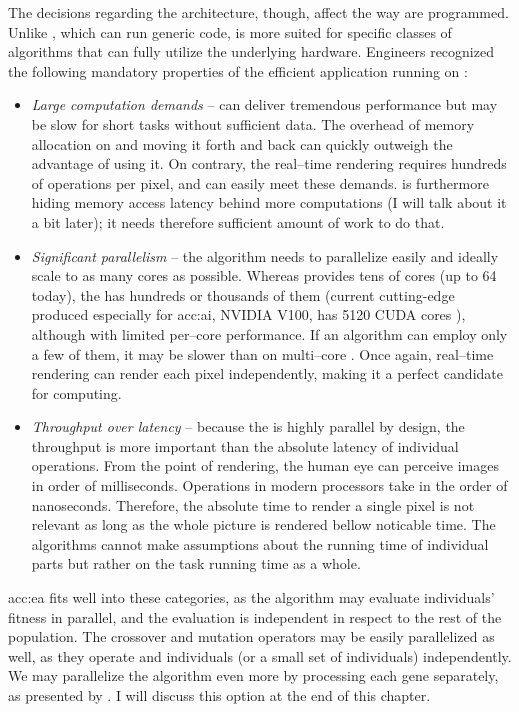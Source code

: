 The decisions regarding the architecture, though, affect the way  are programmed. Unlike \cpu, which can run generic code, \gpu is more suited for specific classes of algorithms that can fully utilize the underlying hardware. Engineers recognized the following mandatory properties of the efficient application running on \gpu \citep{GPUComputingOwens}:
\begin{itemize}
    \item \textit{Large computation demands} -- \gpu can deliver tremendous performance but may be slow for short tasks without sufficient data. The overhead of memory allocation on \gpu and moving it forth and back \cpu can quickly outweigh the advantage of using it. On contrary, the real--time rendering requires hundreds of operations per pixel, and \gpu can easily meet these demands. \gpu is furthermore hiding memory access latency behind more computations (I will talk about it a bit later); it needs therefore sufficient amount of work to do that.
    \item \textit{Significant parallelism} -- the algorithm needs to parallelize easily and ideally scale to as many cores as possible. Whereas \cpu provides tens of cores (up to 64 today), the \gpu has hundreds or thousands of them (current cutting-edge \gpu produced especially for \acrshort{acc:ai}, NVIDIA V100, has 5120 CUDA cores \citep{nvidiav100spec}), although with limited per--core performance. If an algorithm can employ only a few of them, it may be slower than on multi--core \cpu. Once again, real--time rendering can render each pixel independently, making it a perfect candidate for \gpu computing.
    \item \textit{Throughput over latency} -- because the \gpu is highly parallel by design, the throughput is more important than the absolute latency of individual operations. From the point of rendering, the human eye can perceive images in order of milliseconds. Operations in modern processors take in the order of nanoseconds. Therefore, the absolute time to render a single pixel is not relevant as long as the whole picture is rendered bellow noticable time. The algorithms cannot make assumptions about the running time of individual parts but rather on the task running time as a whole.
\end{itemize}

\acrlong{acc:ea} fits well into these categories, as the algorithm may evaluate individuals' fitness in parallel, and the evaluation is independent in respect to the rest of the population. The crossover and mutation operators may be easily parallelized as well, as they operate and individuals (or a small set of individuals) independently. We may parallelize the algorithm even more by processing each gene separately, as presented by \citet{CHENG2019514}. I will discuss this option at the end of this chapter.




